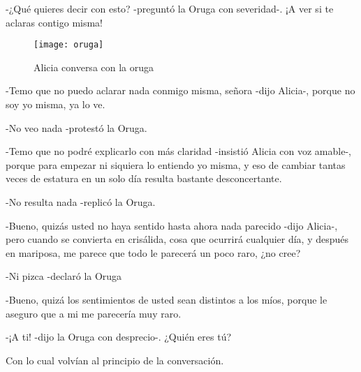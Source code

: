 -¿Qué quieres decir con esto? -preguntó la Oruga con severidad-. ¡A ver si te aclaras contigo misma!

\begin{wrapfigure}[16]{R}{0.30\textwidth}
  \begin{center}
    \texttt{[image: oruga]}
  \end{center}
  \caption{Alicia conversa con la oruga}
\end{wrapfigure}

-Temo que no puedo aclarar nada conmigo misma, señora -dijo Alicia-, porque no soy yo misma, ya lo ve.

-No veo nada -protestó la Oruga.

-Temo que no podré explicarlo con más claridad -insistió Alicia con voz amable-, porque para empezar ni siquiera lo entiendo yo misma, y eso de cambiar tantas veces de estatura en un solo día resulta bastante desconcertante.

-No resulta nada -replicó la Oruga.

-Bueno, quizás usted no haya sentido hasta ahora nada parecido -dijo Alicia-, pero cuando se convierta en crisálida, cosa que ocurrirá cualquier día, y después en mariposa, me parece que todo le parecerá un poco raro, ¿no cree?

-Ni pizca -declaró la Oruga

-Bueno,  quizá los sentimientos de usted sean distintos a los míos, porque le aseguro que a mi me parecería muy raro.

-¡A ti! -dijo la Oruga con desprecio-. ¿Quién eres tú?

Con lo cual volvían al principio de la conversación.